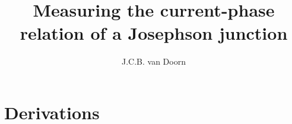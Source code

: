 \documentclass[twoside,single]{lion-msc}
\title{Measuring the current-phase relation of a Josephson junction}
\author{J.C.B. van Doorn}
\begin{document}
	\maketitle

	\tableofcontents

	
	
	
	
	
	

	\appendix
	\chapter{Derivations}
	
%	

	\printbibliography
\end{document}

